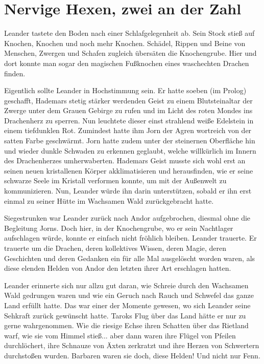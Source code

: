 \documentclass[10pt, a4paper, oneside]{book}
\begin{document}
\newpage
\section{Nervige Hexen, zwei an der Zahl}


Leander tastete den Boden nach einer Schlafgelegenheit ab. Sein Stock stieß auf Knochen, Knochen und noch mehr Knochen. Schädel, Rippen und Beine von Menschen, Zwergen und Schafen zugleich übersäten die Knochengrube. Hier und dort konnte man sogar den magischen Fußknochen eines waschechten Drachen finden.

Eigentlich sollte Leander in Hochstimmung sein. Er hatte soeben (im Prolog) geschafft, Hademars stetig stärker werdenden Geist zu einem Blutsteinaltar der Zwerge unter dem Grauen Gebirge zu rufen und im Licht des roten Mondes ins Drachenherz zu sperren. Nun leuchtete dieser einst strahlend weiße Edelstein in einem tiefdunklen Rot. Zumindest hatte ihm Jorn der Agren wortreich von der satten Farbe geschwärmt. Jorn hatte zudem unter der steinernen Oberfläche hin und wieder dunkle Schwaden zu erkennen geglaubt, welche willkürlich im Innern des Drachenherzes umherwaberten. Hademars Geist musste sich wohl erst an seinen neuen kristallenen Körper akklimatisieren und herausfinden, wie er seine schwarze Seele im Kristall verformen konnte, um mit der Außenwelt zu kommunizieren. Nun, Leander würde ihn darin unterstützen, sobald er ihn erst einmal zu seiner Hütte im Wachsamen Wald zurückgebracht hatte.

Siegestrunken war Leander zurück nach Andor aufgebrochen, diesmal ohne die Begleitung Jorns. Doch hier, in der Knochengrube, wo er sein Nachtlager aufschlagen würde, konnte er einfach nicht fröhlich bleiben. Leander trauerte. Er trauerte um die Drachen, deren kollektives Wissen, deren Magie, deren Geschichten und deren Gedanken ein für alle Mal ausgelöscht worden waren, als diese elenden Helden von Andor den letzten ihrer Art erschlagen hatten.

Leander erinnerte sich nur allzu gut daran, wie Schreie durch den Wachsamen Wald gedrungen waren und wie ein Geruch nach Rauch und Schwefel das ganze Land erfüllt hatte. Das war einer der Momente gewesen, wo sich Leander seine Sehkraft zurück gewünscht hatte. Taroks Flug über das Land hätte er nur zu gerne wahrgenommen. Wie die riesige Echse ihren Schatten über das Rietland warf, wie sie vom Himmel stieß... aber dann waren ihre Flügel von Pfeilen durchlöchert, ihre Schnauze von Äxten zerkratzt und ihre Herzen von Schwertern durchstoßen wurden. Barbaren waren sie doch, diese Helden! Und nicht nur Fenn.
\end{document}
